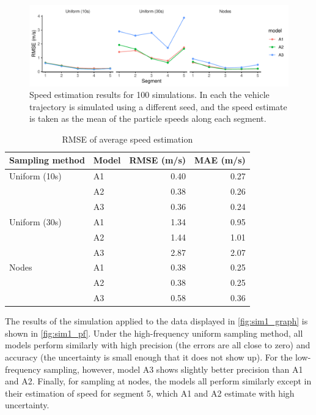 \begin{knitrout}\small
{}\color{fgcolor}\begin{figure}
\includegraphics[width=\maxwidth]{figure/sim1_pf_full-1} \caption[Speed estimation results for 100 simulations]{Speed estimation results for 100 simulations. In each the vehicle trajectory is simulated using a different seed, and the speed estimate is taken as the mean of the particle speeds along each segment.}\label{fig:sim1_pf_full}
\end{figure}

\begin{table}

\caption{\label{tab:sim1_pf_full}RMSE of average speed estimation}
\centering
\fontsize{8}{10}\selectfont
\begin{tabular}[t]{llrr}
\toprule
Sampling method & Model & RMSE (m/s) & MAE (m/s)\\
\midrule
Uniform (10s) & A1 & 0.40 & 0.27\\
 & A2 & 0.38 & 0.26\\
 & A3 & 0.36 & 0.24\\
\midrule
Uniform (30s) & A1 & 1.34 & 0.95\\
 & A2 & 1.44 & 1.01\\
 & A3 & 2.87 & 2.07\\
\midrule
Nodes & A1 & 0.38 & 0.25\\
 & A2 & 0.38 & 0.25\\
 & A3 & 0.58 & 0.36\\
\bottomrule
\end{tabular}
\end{table}


\end{knitrout}

The results of the simulation applied to the data displayed in \cref{fig:sim1_graph} is shown in \cref{fig:sim1_pf}. Under the high-frequency uniform sampling method, all models perform similarly with high precision (the errors are all close to zero) and accuracy (the uncertainty is small enough that it does not show up). For the low-frequency sampling, however, model A3 shows slightly better precision than A1 and A2. Finally, for sampling at nodes, the models all perform similarly except in their estimation of speed for segment 5, which A1 and A2 estimate with high uncertainty.


